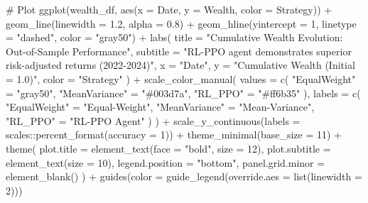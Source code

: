 \documentclass[
  10pt,
  a4paper,
]{article}
\newenvironment{Shaded}{\begin{snugshade}}{\end{snugshade}}
\newcommand{\AttributeTok}[1]{\textcolor[rgb]{0.40,0.45,0.13}{#1}}
\newcommand{\CommentTok}[1]{\textcolor[rgb]{0.37,0.37,0.37}{#1}}
\newcommand{\DecValTok}[1]{\textcolor[rgb]{0.68,0.00,0.00}{#1}}
\newcommand{\FloatTok}[1]{\textcolor[rgb]{0.68,0.00,0.00}{#1}}
\newcommand{\FunctionTok}[1]{\textcolor[rgb]{0.28,0.35,0.67}{#1}}
\newcommand{\NormalTok}[1]{\textcolor[rgb]{0.00,0.23,0.31}{#1}}
\newcommand{\OtherTok}[1]{\textcolor[rgb]{0.00,0.23,0.31}{#1}}
\newcommand{\SpecialCharTok}[1]{\textcolor[rgb]{0.37,0.37,0.37}{#1}}
\newcommand{\StringTok}[1]{\textcolor[rgb]{0.13,0.47,0.30}{#1}}
\begin{document}
\begin{Shaded}
\begin{Highlighting}[]
\CommentTok{\# Plot}
\FunctionTok{ggplot}\NormalTok{(wealth\_df, }\FunctionTok{aes}\NormalTok{(}\AttributeTok{x =}\NormalTok{ Date, }\AttributeTok{y =}\NormalTok{ Wealth, }\AttributeTok{color =}\NormalTok{ Strategy)) }\SpecialCharTok{+}
  \FunctionTok{geom\_line}\NormalTok{(}\AttributeTok{linewidth =} \FloatTok{1.2}\NormalTok{, }\AttributeTok{alpha =} \FloatTok{0.8}\NormalTok{) }\SpecialCharTok{+}
  \FunctionTok{geom\_hline}\NormalTok{(}\AttributeTok{yintercept =} \DecValTok{1}\NormalTok{, }\AttributeTok{linetype =} \StringTok{"dashed"}\NormalTok{, }\AttributeTok{color =} \StringTok{"gray50"}\NormalTok{) }\SpecialCharTok{+}
  \FunctionTok{labs}\NormalTok{(}
    \AttributeTok{title =} \StringTok{"Cumulative Wealth Evolution: Out{-}of{-}Sample Performance"}\NormalTok{,}
    \AttributeTok{subtitle =} \StringTok{"RL{-}PPO agent demonstrates superior risk{-}adjusted returns (2022{-}2024)"}\NormalTok{,}
    \AttributeTok{x =} \StringTok{"Date"}\NormalTok{,}
    \AttributeTok{y =} \StringTok{"Cumulative Wealth (Initial = 1.0)"}\NormalTok{,}
    \AttributeTok{color =} \StringTok{"Strategy"}
\NormalTok{  ) }\SpecialCharTok{+}
  \FunctionTok{scale\_color\_manual}\NormalTok{(}
    \AttributeTok{values =} \FunctionTok{c}\NormalTok{(}
      \StringTok{"EqualWeight"} \OtherTok{=} \StringTok{"gray50"}\NormalTok{,}
      \StringTok{"MeanVariance"} \OtherTok{=} \StringTok{"\#003d7a"}\NormalTok{,}
      \StringTok{"RL\_PPO"} \OtherTok{=} \StringTok{"\#ff6b35"}
\NormalTok{    ),}
    \AttributeTok{labels =} \FunctionTok{c}\NormalTok{(}
      \StringTok{"EqualWeight"} \OtherTok{=} \StringTok{"Equal{-}Weight"}\NormalTok{,}
      \StringTok{"MeanVariance"} \OtherTok{=} \StringTok{"Mean{-}Variance"}\NormalTok{,}
      \StringTok{"RL\_PPO"} \OtherTok{=} \StringTok{"RL{-}PPO Agent"}
\NormalTok{    )}
\NormalTok{  ) }\SpecialCharTok{+}
  \FunctionTok{scale\_y\_continuous}\NormalTok{(}\AttributeTok{labels =}\NormalTok{ scales}\SpecialCharTok{::}\FunctionTok{percent\_format}\NormalTok{(}\AttributeTok{accuracy =} \DecValTok{1}\NormalTok{)) }\SpecialCharTok{+}
  \FunctionTok{theme\_minimal}\NormalTok{(}\AttributeTok{base\_size =} \DecValTok{11}\NormalTok{) }\SpecialCharTok{+}
  \FunctionTok{theme}\NormalTok{(}
    \AttributeTok{plot.title =} \FunctionTok{element\_text}\NormalTok{(}\AttributeTok{face =} \StringTok{"bold"}\NormalTok{, }\AttributeTok{size =} \DecValTok{12}\NormalTok{),}
    \AttributeTok{plot.subtitle =} \FunctionTok{element\_text}\NormalTok{(}\AttributeTok{size =} \DecValTok{10}\NormalTok{),}
    \AttributeTok{legend.position =} \StringTok{"bottom"}\NormalTok{,}
    \AttributeTok{panel.grid.minor =} \FunctionTok{element\_blank}\NormalTok{()}
\NormalTok{  ) }\SpecialCharTok{+}
  \FunctionTok{guides}\NormalTok{(}\AttributeTok{color =} \FunctionTok{guide\_legend}\NormalTok{(}\AttributeTok{override.aes =} \FunctionTok{list}\NormalTok{(}\AttributeTok{linewidth =} \DecValTok{2}\NormalTok{)))}
\end{Highlighting}
\end{Shaded}
\end{document}
